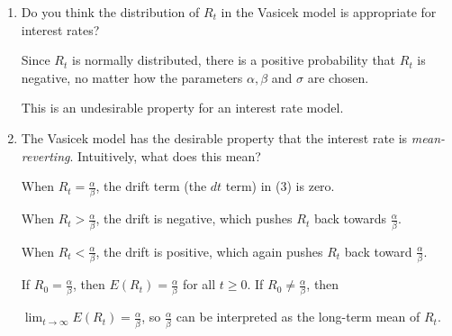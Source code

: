 \documentclass[handout,8pt]{beamer}
\begin{document}
\begin{frame}[allowframebreaks]{ }
\begin{enumerate}
\begin{enumerate}
        \vspace*{2cm}
        
        \item Do you think the distribution of $R_t$ in the Vasicek model is appropriate for interest rates?\newline        
        
        Since $R_t$ is normally distributed, there is a positive probability that $R_t$ is negative, no matter how the parameters $\alpha, \beta$ and $\sigma$ are chosen. \newline
        
        This is an undesirable property for an interest rate model. \newline
        
        \newpage 
        
        \vspace*{1.5cm}
        
        \item The Vasicek model has the desirable property that the interest rate is \textit{mean-reverting}. Intuitively, what does this mean? \newline
        
        When $R_t = \frac{\alpha}{\beta}$, the drift term (the $dt$ term) in (3) is zero. \newline 
        
        When $R_t > \frac{\alpha}{\beta}$, the drift is negative, which pushes $R_t$ back towards $\frac{\alpha}{\beta}$. \newline
        
        When $R_t < \frac{\alpha}{\beta}$, the drift is positive, which again pushes $R_t$ back toward $\frac{\alpha}{\beta}$. \newline
        
        If $R_0 = \frac{\alpha}{\beta}$, then $E(R_t) = \frac{\alpha}{\beta}$ for all $t\geq 0$. If $R_0 \neq \frac{\alpha}{\beta}$, then \newline
        
        $\lim_{t\rightarrow \infty} E(R_t) = \frac{\alpha}{\beta}$, so $\frac{\alpha}{\beta}$ can 	be interpreted as the long-term mean of $R_t$.
    \end{enumerate}
    
    \newpage
    

\end{enumerate}
\end{frame}
\end{document}
